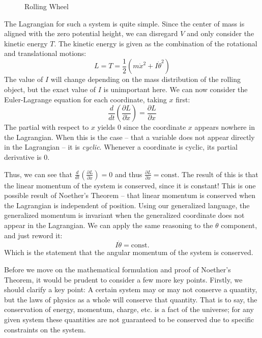 \begin{example}
\begin{figure}[H]
    \caption{Rolling Wheel}
    \label{fig:roll wheel}
\end{figure}
The \gls{Lagrangian} for such a system is quite simple. Since the center of mass is aligned with the zero potential height, we can disregard $V$ and only consider the kinetic energy $T$. The kinetic energy is given as the combination of the rotational and translational motions:
$$L=T=\frac{1}{2}\left(m\dot{x}^2+I\dot{\theta}^2\right)$$
The value of $I$ will change depending on the mass distribution of the rolling object, but the exact value of $I$ is unimportant here. We can now consider the Euler-Lagrange equation for each coordinate, taking $x$ first:
$$\frac{d}{dt}\left(\frac{\partial L}{\partial \dot{x}}\right)=\frac{\partial L}{\partial x}$$
The partial with respect to $x$ yields $0$ since the coordinate $x$ appears nowhere in the \gls{Lagrangian}. When this is the case -- that a variable does not appear directly in the \gls{Lagrangian} -- it is \textit{cyclic}. Whenever a coordinate is cyclic, its partial derivative is 0.

Thus, we can see that $\frac{d}{dt}\left(\frac{\partial L}{\partial \dot{x}}\right)=0$ and thus $\frac{\partial L}{\partial \dot{x}}=\mathrm{const.}$ The result of this is that the linear momentum of the system is conserved, since it is constant! This is one possible result of Noether's Theorem -- that linear momentum is conserved when the \gls{Lagrangian} is independent of position.  Using our generalized language, the generalized momentum is invariant when the generalized coordinate does not appear in the \gls{Lagrangian}. We can apply the same reasoning to the $\theta$ component, and just reword it:
$$I\dot{\theta}=\mathrm{const.}$$
Which is the statement that the angular momentum of the system is conserved.
\end{example}

Before we move on the mathematical formulation and proof of Noether's Theorem, it would be prudent to consider a few more key points. Firstly, we should clarify a key point: A certain system may or may not conserve a quantity, but the laws of physics as a whole will conserve that quantity. That is to say, the conservation of energy, momentum, charge, etc. is a fact of the universe; for any given system these quantities are not guaranteed to be conserved due to specific constraints on the system.

